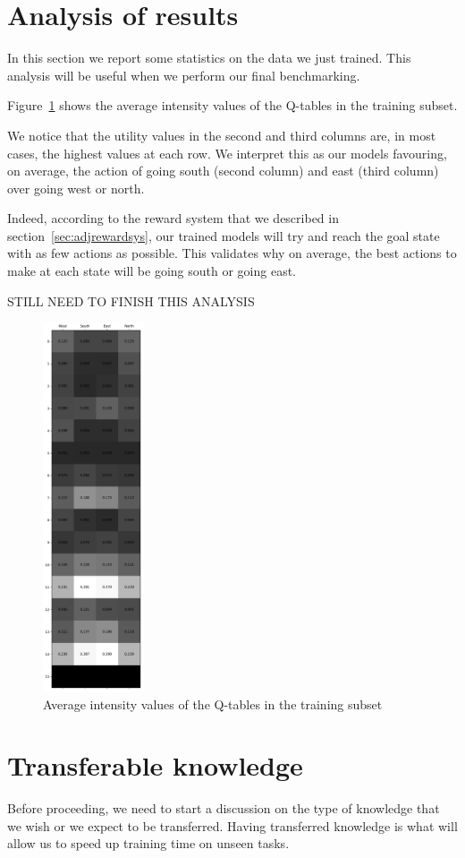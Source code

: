 \section{Analysis of results}
\label{sec:analysisresults}
In this section we report some statistics on the data we just trained. This analysis will be useful when we perform our final benchmarking.

Figure~\ref{fig:Qvalues} shows the average intensity values of the Q-tables in the training subset.

We notice that the utility values in the second and third columns are, in most cases, the highest values at each row. We interpret this as our models favouring, on average, the action of going south (second column) and east (third column) over going west or north.

Indeed, according to the reward system that we described in section~\ref{sec:adjrewardsys}, our trained models will try and reach the goal state with as few actions as possible. This validates why on average, the best actions to make at each state will be going south or going east.

STILL NEED TO FINISH THIS ANALYSIS
\begin{figure}
\centering
\includegraphics[width=3cm]{Figures/Qtable_mean}
\caption{Average intensity values of the Q-tables in the training subset}
\label{fig:Qvalues}
\end{figure}

\section{Transferable knowledge}
\label{sec:transferableknowledge}
Before proceeding, we need to start a discussion on the type of knowledge that we wish or we expect to be transferred. Having transferred knowledge is what will allow us to speed up training time on unseen tasks.

